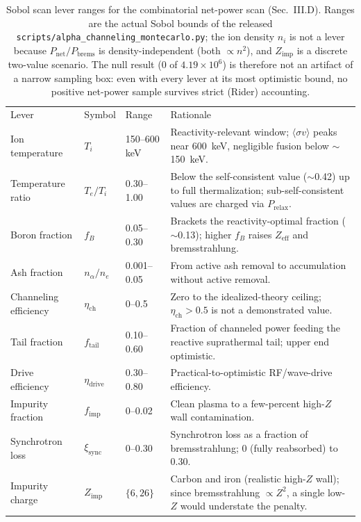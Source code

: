 \documentclass[aip,pop,reprint,amsmath,amssymb,floatfix]{revtex4-2}
\begin{document}
\begin{table}
\caption{Sobol scan lever ranges for the combinatorial net-power scan (Sec.~III.D). Ranges are the actual Sobol bounds of the released \texttt{scripts/alpha\_channeling\_montecarlo.py}; the ion density $n_i$ is not a lever because $P_\mathrm{net}/P_\mathrm{brems}$ is density-independent (both $\propto n^2$), and $Z_\mathrm{imp}$ is a discrete two-value scenario. The null result ($0$ of $4.19\times10^6$) is therefore not an artifact of a narrow sampling box: even with every lever at its most optimistic bound, no positive net-power sample survives strict (Rider) accounting.}
\label{tab:levers}
\begin{ruledtabular}
\begin{tabular}{l l l p{}}
Lever & Symbol & Range & Rationale \\
\colrule
Ion temperature & $T_i$ & 150--600 keV & Reactivity-relevant window; $\langle\sigma v\rangle$ peaks near 600~keV, negligible fusion below $\sim$150~keV. \\
Temperature ratio & $T_e/T_i$ & 0.30--1.00 & Below the self-consistent value ($\sim$0.42) up to full thermalization; sub-self-consistent values are charged via $P_\mathrm{relax}$. \\
Boron fraction & $f_B$ & 0.05--0.30 & Brackets the reactivity-optimal fraction ($\sim$0.13); higher $f_B$ raises $Z_\mathrm{eff}$ and bremsstrahlung. \\
Ash fraction & $n_\alpha/n_e$ & 0.001--0.05 & From active ash removal\cite{ochs} to accumulation without active removal. \\
Channeling efficiency & $\eta_\mathrm{ch}$ & 0--0.5 & Zero to the idealized-theory ceiling; $\eta_\mathrm{ch}>0.5$ is not a demonstrated value\cite{ochs}. \\
Tail fraction & $f_\mathrm{tail}$ & 0.10--0.60 & Fraction of channeled power feeding the reactive suprathermal tail; upper end optimistic. \\
Drive efficiency & $\eta_\mathrm{drive}$ & 0.30--0.80 & Practical-to-optimistic RF/wave-drive efficiency. \\
Impurity fraction & $f_\mathrm{imp}$ & 0--0.02 & Clean plasma to a few-percent high-$Z$ wall contamination. \\
Synchrotron loss & $\xi_\mathrm{sync}$ & 0--0.30 & Synchrotron loss as a fraction of bremsstrahlung; 0 (fully reabsorbed) to 0.30. \\
Impurity charge & $Z_\mathrm{imp}$ & $\{6, 26\}$ & Carbon and iron (realistic high-$Z$ wall); since bremsstrahlung $\propto Z^2$, a single low-$Z$ would understate the penalty. \\
\end{tabular}
\end{ruledtabular}
\end{table}
\end{document}
